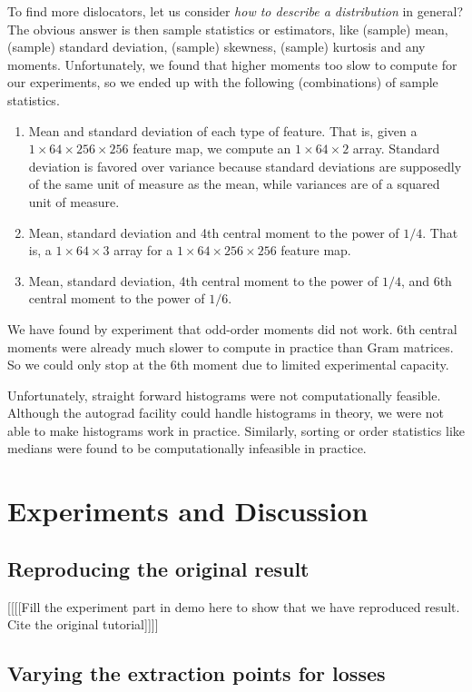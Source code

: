 \documentclass[runningheads]{llncs}
\begin{document}
To find more dislocators, let us consider \emph{how to describe a distribution} in general?
The obvious answer is then sample statistics or estimators, like (sample) mean, (sample) standard deviation, 
(sample) skewness, (sample) kurtosis and any moments.
Unfortunately, we found that higher moments too slow to compute for our experiments,
so we ended up with the following (combinations) of sample statistics.
\begin{enumerate}
\item Mean and standard deviation of each type of feature. 
That is, given a $1\times64\times256\times256$ feature map, 
we compute an $1\times64\times2$ array.
Standard deviation is favored over variance because standard deviations 
are supposedly of the same unit of measure as the mean, 
while variances are of a squared unit of measure.
\item Mean, standard deviation and 4th central moment to the power of $1/4$. 
That is, a $1\times64\times3$ array for a $1\times64\times256\times256$ feature map.
\item Mean, standard deviation, 4th central moment to the power of $1/4$, 
and 6th central moment to the power of $1/6$.
\end{enumerate}
We have found by experiment that odd-order moments did not work.
6th central moments were already much slower to compute in practice 
than Gram matrices.
So we could only stop at the 6th moment due to limited experimental capacity.

Unfortunately, straight forward histograms were not computationally feasible.
Although the autograd facility could handle histograms in theory, we were not
able to make histograms work in practice. Similarly, sorting or order statistics
like medians were found to be computationally infeasible in practice.

\section{Experiments and Discussion}

\subsection{Reproducing the original result}
[[[[Fill the experiment part in demo here to show that we have reproduced result.
Cite the original tutorial]]]] \cite{tut}

\subsection{Varying the extraction points for losses}
\end{document}
